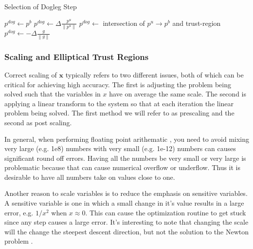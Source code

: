 \documentclass[peerreview,compsoc,onecolumn]{IEEEtran}
\newcommand{\norm}[1]{\left\lVert#1\right\rVert}
\begin{document}
\begin{algorithm}{}
\caption{\label{alg:dogleg_step}Selection of Dogleg Step}
\begin{algorithmic}[1]
    \If{$\norm{p^b} < \Delta$} 
      \State $p^{dog} \gets p^b$
    \ElsIf{$\norm{p^u} \geq \Delta$} 
    \State $p^{dog} \gets \Delta \frac{p^u}{\norm{p^u}}$
    \Else
    \State $p^{dog} \gets $ intersection of $p^u \rightarrow p^b$ and trust-region
    \EndIf
  \Else
   \State $p^{dog} \gets -\Delta\frac{g}{\norm{g}}$ 
  \EndIf
\end{algorithmic}
\end{algorithm}

\subsubsection{Scaling and Elliptical Trust Regions} 
\label{section:scaling}

Correct scaling of $\bm{x}$ typically refers to two different issues, both of which can be critical for achieving high accuracy. The first is adjusting the problem being solved such that the variables in $x$ have on average the same scale. The second is applying a linear transform to the system so that at each iteration the linear problem being solved. The first method we will refer to as prescaling and the second as post scaling.

In general, when performing floating point arithematic \cite{goldberg1991every}, you need to avoid mixing very large (e.g. 1e8) numbers with very small (e.g. 1e-12) numbers can causes significant round off errors. Having all the numbers be very small or very large is problematic because that can cause numerical overflow or underflow. Thus it is desirable to have all numbers take on values close to one.

Another reason to scale variables is to reduce the emphasis on sensitive variables. A sensitive variable is one in which a small change in it's value results in a large error, e.g. $1/x^2$ when $x \approx 0$. This can cause the optimization routine to get stuck since any step causes a large error. It's interesting to note that changing the scale will the change the steepest descent direction, but not the solution to the Newton problem \cite{dennis1996}. 
\end{document}
